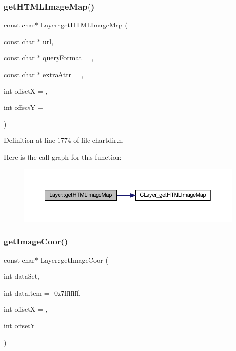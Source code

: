 \subsubsection{\texorpdfstring{get\+H\+T\+M\+L\+Image\+Map()}{getHTMLImageMap()}}
{\footnotesize\ttfamily const char$\ast$ Layer\+::get\+H\+T\+M\+L\+Image\+Map (\begin{DoxyParamCaption}\item[{const char $\ast$}]{url,  }\item[{const char $\ast$}]{query\+Format = {},  }\item[{const char $\ast$}]{extra\+Attr = {},  }\item[{int}]{offsetX = {},  }\item[{int}]{offsetY = {} }\end{DoxyParamCaption})\hspace{0.3cm}{\ttfamily [inline]}}



Definition at line 1774 of file chartdir.\+h.

Here is the call graph for this function\+:
\nopagebreak
\begin{figure}[H]
\begin{center}
\leavevmode
\includegraphics[width=350pt]{class_layer_ad4e641a703136de5642873341a52be7d_cgraph}
\end{center}
\end{figure}
\mbox{\label{class_layer_a8d8ff0e7b080f019c44e8a0b4080e6a0}} 
\subsubsection{\texorpdfstring{get\+Image\+Coor()}{getImageCoor()}}
{\footnotesize\ttfamily const char$\ast$ Layer\+::get\+Image\+Coor (\begin{DoxyParamCaption}\item[{int}]{data\+Set,  }\item[{int}]{data\+Item = {\ttfamily -\/0x7fffffff},  }\item[{int}]{offsetX = {},  }\item[{int}]{offsetY = {} }\end{DoxyParamCaption})\hspace{0.3cm}{\ttfamily [inline]}}



